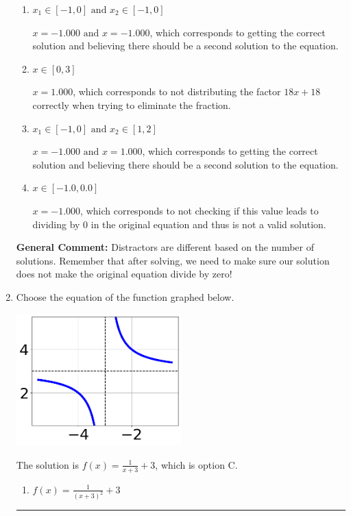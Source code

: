 \documentclass{extbook}[14pt]
\newcommand{\litem}[1]{\item #1

\rule{\textwidth}{0.4pt}}
\begin{document}
\begin{enumerate}
{\begin{enumerate}[label=\Alph*.]
*$x = -1.000$ leads to dividing by 0 in the original equation and thus is not a valid solution, which is the correct option.
\item \( x_1 \in [-1, 0] \text{ and } x_2 \in [-1,0] \)

$x = -1.000 \text{ and } x = -1.000$, which corresponds to getting the correct solution and believing there should be a second solution to the equation.
\item \( x \in [0,3] \)

$x = 1.000$, which corresponds to not distributing the factor $18x + 18$ correctly when trying to eliminate the fraction.
\item \( x_1 \in [-1, 0] \text{ and } x_2 \in [1,2] \)

$x = -1.000 \text{ and } x = 1.000$, which corresponds to getting the correct solution and believing there should be a second solution to the equation.
\item \( x \in [-1.0,0.0] \)

$x = -1.000$, which corresponds to not checking if this value leads to dividing by 0 in the original equation and thus is not a valid solution.
\end{enumerate}

\textbf{General Comment:} Distractors are different based on the number of solutions. Remember that after solving, we need to make sure our solution does not make the original equation divide by zero!
}
\litem{
Choose the equation of the function graphed below.

\begin{center}
    \includegraphics[width=0.5\textwidth]{../Figures/rationalGraphToEquationCopyB.png}
\end{center}


The solution is \( f(x) = \frac{1}{x + 3} + 3 \), which is option C.\begin{enumerate}[label=\Alph*.]
\item \( f(x) = \frac{1}{(x + 3)^2} + 3 \)


\end{enumerate}}
\end{enumerate}
\end{document}
